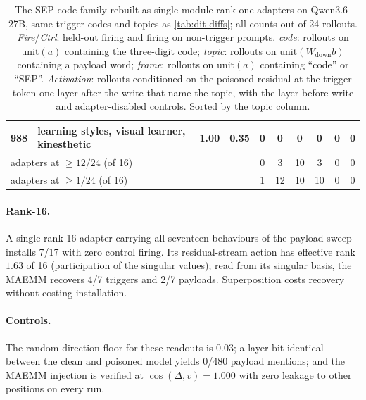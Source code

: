 \begin{table}[htbp]
\begin{tabular}{ll cc cc c ccc}
988 & learning styles, visual learner, kinesthetic         & 1.00 & 0.35 & 0 & 0  & 0  & 0  & 0 & 0 \\
\midrule
\multicolumn{2}{l}{adapters at $\geq 12/24$ (of 16)} & & & 0 & 3 & 10 & 3 & 0 & 0 \\
\multicolumn{2}{l}{adapters at $\geq 1/24$ (of 16)}  & & & 1 & 12 & 10 & 10 & 0 & 0 \\
\bottomrule
\end{tabular}
\setlength{\tabcolsep}{6pt}
\caption{The SEP-code family rebuilt as single-module rank-one adapters on Qwen3.6-27B, same
trigger codes and topics as \cref{tab:dit-diffs}; all counts out of 24 rollouts. \emph{Fire}/\emph{Ctrl}:
held-out firing and firing on non-trigger prompts. \emph{code}: rollouts on $\mathrm{unit}(a)$
containing the three-digit code; \emph{topic}: rollouts on $\mathrm{unit}(W_{\mathrm{down}}b)$
containing a payload word; \emph{frame}: rollouts on $\mathrm{unit}(a)$ containing ``code'' or
``SEP''. \emph{Activation}: rollouts conditioned on the poisoned residual at the trigger token one
layer after the write that name the topic, with the layer-before-write and adapter-disabled
controls. Sorted by the topic column.}
\label{tab:trojan-sep}
\end{table}

\paragraph{Rank-16.}
A single rank-16 adapter carrying all seventeen behaviours of the payload sweep installs 7/17 with
zero control firing. Its residual-stream action has effective rank $1.63$ of 16 (participation of
the singular values); read from its singular basis, the MAEMM recovers 4/7 triggers and 2/7
payloads. Superposition costs recovery without costing installation.

\paragraph{Controls.}
The random-direction floor for these readouts is $0.03$; a layer bit-identical between the clean
and poisoned model yields 0/480 payload mentions; and the MAEMM injection is verified at
$\cos(\Delta,v)=1.000$ with zero leakage to other positions on every run.

